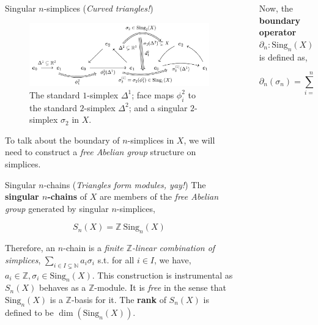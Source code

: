 \documentclass[final]{beamer}
\newenvironment{highlight}
{\begin{tcolorbox}[colback=lightblue, boxrule=0pt, frame empty]}
{\end{tcolorbox}}
\newlength{\sepwidth}
\newlength{\colwidth}
\newcommand{\separatorcolumn}{\begin{column}{\sepwidth}\end{column}}
\newcommand{\sing}{\text{Sing}}
\theoremstyle{remark}
\begin{document}
\begin{frame}[t]
\begin{columns}[t]
\begin{column}{\colwidth}
\begin{block}{Singular $n$-simplices (\emph{Curved triangles!})}
\begin{figure}[H]
\begin{center}
\includegraphics[width=0.75\colwidth]{singular_simplex}
\end{center}
\caption{The standard $1$-simplex $\Delta^1$; face maps $\phi^2_i$ to the standard $2$-simplex $\Delta^2$; and a singular $2$-simplex $\sigma_2$ in $X$.}
\end{figure}

To talk about the boundary of $n$-simplices in $X$, we will need to construct a \emph{free Abelian group} structure on simplices. 
\end{block}

\begin{block}{Singular $n$-chains (\emph{Triangles form modules, yay!})}
The \textbf{singular $n$-chains} of $X$ are members of the \emph{free Abelian group} generated by singular $n$-simplices,

$$S_n(X) = \mathbb{Z} \: \sing_n(X)$$

Therefore, an $n$-chain is a \emph{finite $\mathbb{Z}$-linear combination of simplices}, $\displaystyle{\sum_{i \in I \subsetneq \mathbb{N}} a_i \sigma_i}$ s.t. for all $i \in I$, we have, $a_i \in \mathbb{Z}, \sigma_i \in \sing_n(X)$. This construction is instrumental as $S_n(X)$ behaves as a $\mathbb{Z}$-module. It is \emph{free} in the sense that $\sing_n(X)$ is a $\mathbb{Z}$-basis for it. The \textbf{rank} of $S_n(X)$ is defined to be $\dim(\sing_n(X))$.

\end{block}

\end{column}

\separatorcolumn

\begin{column}{\colwidth}
Now, the \textbf{boundary operator} $\partial_n : \sing_n(X) \to S_{n-1}(X)$ is defined as,

\begin{highlight}
$$\partial_n(\sigma_n) = \sum_{i=0}^n (-1)^n d^n_i(\sigma_n) = \sum_{i=0}^n (-1)^i \sigma_n^{(i)}$$
\end{highlight}


\end{column}
\end{columns}
\end{frame}
\end{document}
